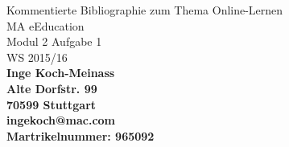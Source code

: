 \begin{titlepage}
\thispagestyle{empty}
\begin{minipage}[c]{1.1\textwidth}
\begin{center}

{\Large {\color{blue} Kommentierte Bibliographie zum Thema Online-Lernen\\ [2cm]
{\large MA eEducation\\ Modul 2 Aufgabe 1 \\ WS 2015/16}\\[2cm]}
{\normalsize \bfseries \color{magenta}Inge Koch-Meinass\\ Alte Dorfstr. 99\\ 70599 Stuttgart\\ ingekoch@mac.com\\ Martrikelnummer: 965092}}


\end{center}
\end{minipage}
\end{titlepage}
